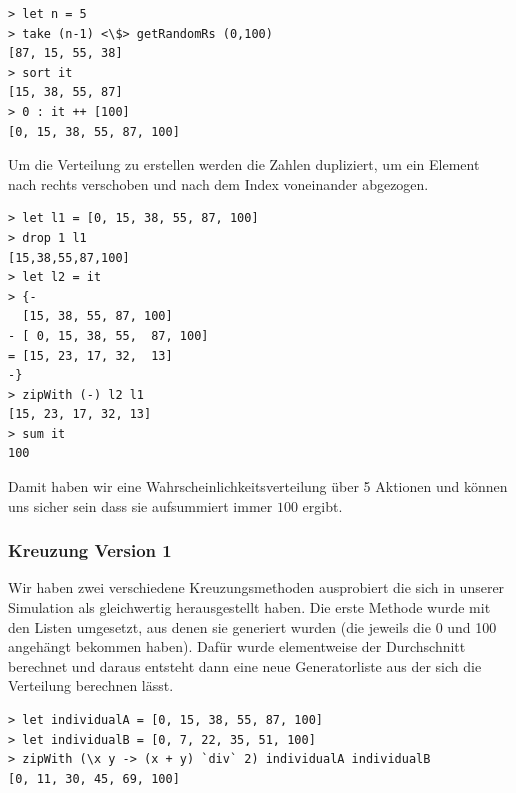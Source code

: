             \begin{mdframed}
            \begin{verbatim}
> let n = 5
> take (n-1) <\$> getRandomRs (0,100)
[87, 15, 55, 38]
> sort it
[15, 38, 55, 87]
> 0 : it ++ [100]
[0, 15, 38, 55, 87, 100]
            \end{verbatim}
            \end{mdframed}
            \noindent
            Um die Verteilung zu erstellen werden die Zahlen dupliziert, um ein Element nach rechts verschoben und nach dem Index voneinander abgezogen.
            \begin{mdframed}
            \begin{verbatim}
> let l1 = [0, 15, 38, 55, 87, 100]
> drop 1 l1
[15,38,55,87,100]
> let l2 = it
> {-
  [15, 38, 55, 87, 100]
- [ 0, 15, 38, 55,  87, 100]
= [15, 23, 17, 32,  13]
-}
> zipWith (-) l2 l1
[15, 23, 17, 32, 13]
> sum it
100
            \end{verbatim}
            \end{mdframed}
            \noindent
            Damit haben wir eine Wahrscheinlichkeitsverteilung über 5 Aktionen und können uns sicher sein dass sie aufsummiert immer $100$ ergibt.

            \subsubsection*{Kreuzung Version 1}
            Wir haben zwei verschiedene Kreuzungsmethoden ausprobiert die sich in unserer Simulation als gleichwertig herausgestellt haben.
            Die erste Methode wurde mit den Listen umgesetzt, aus denen sie generiert wurden (die jeweils die 0 und 100 angehängt bekommen haben). Dafür wurde elementweise der Durchschnitt berechnet und daraus entsteht dann eine neue Generatorliste aus der sich die Verteilung berechnen lässt.
            \begin{mdframed}
            \begin{verbatim}
> let individualA = [0, 15, 38, 55, 87, 100]
> let individualB = [0, 7, 22, 35, 51, 100]
> zipWith (\x y -> (x + y) `div` 2) individualA individualB
[0, 11, 30, 45, 69, 100]
            \end{verbatim}
            \end{mdframed}
